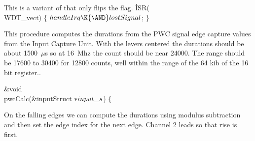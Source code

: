 This is a variant of  that only flips the 
flag.
\Y\B\.{ISR}(\\{WDT\_vect})\7
${}\{{}$\1\7
${}\\{handleIrq}\K{\AND}\\{lostSignal}{}$;\7
\4${}\}{}$\2\Y\par
\fi

This procedure computes the durations from the PWC signal edge capture values
from the Input Capture Unit.
With the levers centered the durations should be about 1500~$\mu$s so at
16~Mhz the count should be near 24000.
The range should be 17600 to 30400 for 12800 counts, well within the range
of the 64 kib of the 16 bit register..


\Y\B\&{void} \\{pwcCalc}(\&{inputStruct} ${}{*}\\{input\_s}{}$)\1\1\7
$\{{}$\Y\par
\fi

On the falling edges we can compute the durations using modulus subtraction
and then set the edge index for the next edge.
Channel 2 leads so that rise is first.

